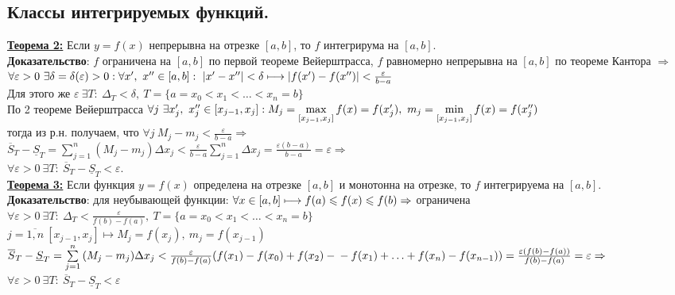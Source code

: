 \documentclass[a4paper,12pt]{article} %
\renewcommand {\leq}{\leqslant}
\begin{document}
\subsection{Классы интегрируемых функций.}


\underline{\textbf{Теорема 2:}} Если $y=f(x)$ непрерывна на отрезке $[a,b]$, то $f$ интегрирума на $[a,b]$.\\

\textbf{Доказательство}: $f$ ограничена на $[a,b]$ по первой теореме Вейерштрасса, $f$ равномерно непрерывна на $[a,b]$ по теореме Кантора $\Rightarrow$\\
$\forall\varepsilon>0~\exists\delta=\delta(\varepsilon)>0: \forall x^{\prime},~x^{\prime\prime} \in [a,b]:~|x^{\prime}-x^{\prime\prime}|<\delta \longmapsto\\|f(x^{\prime})-f(x^{\prime\prime})|<\frac{\varepsilon}{b-a}$\\
Для этого же $\varepsilon~\exists T:~\Delta_T<\delta,~T=\{a=x_0<x_1<{\dots}<x_n=b\}$\\
По 2 теореме Вейерштрасса $\forall j~\exists x^{\prime}_j,~x^{\prime\prime}_j\in [x_{j-1},x_j]:~\\
M_j=\max\limits_{[x_{j-1},x_j]}{f(x)}=f(x^{\prime}_j),~m_j=\min\limits_{[x_{j-1},x_j]}{f(x)}=f(x^{\prime\prime}_j)$\\
тогда из р.н. получаем, что $\forall j~M_j-m_j<\frac{\varepsilon}{b-a}\Rightarrow$\\
$\overline{S}_T-\underline{S}_T=\sum\limits^{n}_{j=1}{(M_j-m_j)\Delta x_j}<\frac{\varepsilon}{b-a}\sum\limits^{n}_{j=1}{\Delta x_j}=\frac{\varepsilon(b-a)}{b-a}=\varepsilon\Rightarrow$\\
$\forall\varepsilon>0~\exists T:~\overline{S}_T-\underline{S}_T<\varepsilon$.\\


\underline{\textbf{Теорема 3:}} Если функция $y=f(x)$ определена на отрезке $[a,b]$ и монотонна на отрезке, то $f$ интегрируема на $[a,b]$.\\

\textbf{Доказательство}: для неубывающей функции: $\forall x\in[a,b]\longmapsto\\
f(a)\leq f(x) \leq f(b)\Rightarrow$ ограничена\\
$\forall\varepsilon>0~\exists T:~\Delta_T<\frac{\varepsilon}{f(b)-f(a)},~T=\{a=x_0<x_1<{\dots}<x_n=b\}$\\
$j=\overline{1,n}~[x_{j-1},x_j]\longmapsto
M_j=f(x_j),~m_j=f(x_{j-1})$\\
$\overline{S}_T-\underline{S}_T=\sum\limits^{n}_{j=1}{(M_j-m_j)\Delta x_j}<\frac{\varepsilon}{f(b)-f(a)}(f(x_1)-f(x_0)+f(x_2)-\\
-f(x_1)+{\dots}+f(x_n)-f(x_{n-1}))=\frac{\varepsilon(f(b)-f(a))}{f(b)-f(a)}=\varepsilon\Rightarrow$\\
$\forall\varepsilon>0~\exists T:~\overline{S}_T-\underline{S}_T<\varepsilon$\\
\end{document}
